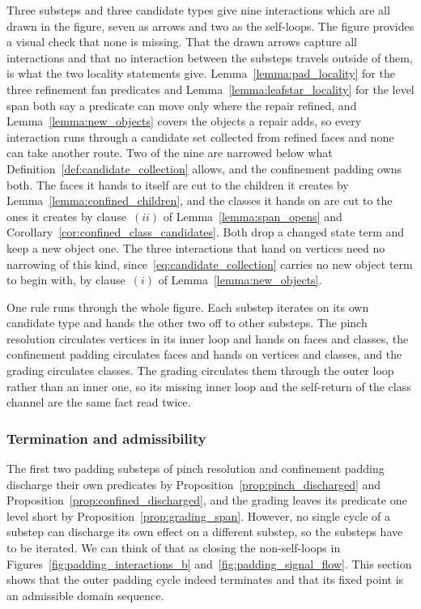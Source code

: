 \documentclass[a4paper, 12pt]{article}
\newcommand{\robert}[1]{{\color{orange} #1}}
\theoremstyle{definition}
\theoremstyle{plain}
\numberwithin{equation}{section}
\begin{document}
Three substeps and three candidate types give nine interactions which are all drawn in the figure, seven as arrows and two as the self-loops. The figure provides a visual check that none is missing. That the drawn arrows capture all interactions and that no interaction between the substeps travels outside of them, is what the two locality statements give. Lemma~\ref{lemma:pad_locality} for the three refinement fan predicates and Lemma~\ref{lemma:leafstar_locality} for the level span both say a predicate can move only where the repair refined, \robert{and Lemma~\ref{lemma:new_objects} covers the objects a repair adds,} so every interaction runs through a candidate set collected from refined faces and none can take another route. \robert{Two of the nine are narrowed below what Definition~\ref{def:candidate_collection} allows, and the confinement padding owns both. The faces it hands to itself are cut to the children it creates by Lemma~\ref{lemma:confined_children}, and the classes it hands on are cut to the ones it creates by clause~$(ii)$ of Lemma~\ref{lemma:span_opens} and Corollary~\ref{cor:confined_class_candidates}. Both drop a changed state term and keep a new object one. The three interactions that hand on vertices need no narrowing of this kind, since~\eqref{eq:candidate_collection} carries no new object term to begin with, by clause~$(i)$ of Lemma~\ref{lemma:new_objects}.}

One rule runs through the whole figure. Each substep iterates on its own candidate type and hands the other two off to other substeps. The pinch resolution circulates vertices in its inner loop and hands on faces and classes, the confinement padding circulates faces and hands on vertices and classes, and the grading circulates classes. The grading circulates them through the outer loop rather than an inner one, so its missing inner loop and the self-return of the class channel are the same fact read twice.

\subsubsection{Termination and admissibility}
\label{subsec:termination}

The first two padding substeps of pinch resolution and confinement padding discharge their own predicates by Proposition~\ref{prop:pinch_discharged} and Proposition~\ref{prop:confined_discharged}, and the grading leaves its predicate one level short by Proposition~\ref{prop:grading_span}. However, no single cycle of a substep can discharge its own effect on a different substep, so the substeps have to be iterated. We can think of that as closing the non-self-loops in Figures~\ref{fig:padding_interactions_b} and~\ref{fig:padding_signal_flow}. This section shows that the outer padding cycle indeed terminates and that its fixed point is an admissible domain sequence.
\end{document}
